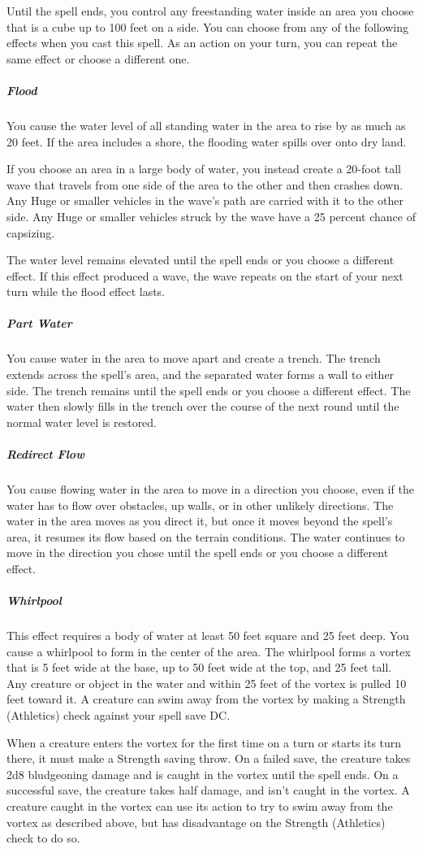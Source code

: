 Until the spell ends, you control any freestanding water inside an area you choose that is a cube up to 100 feet on a side. You can choose from any of the following effects when you cast this spell. As an action on your turn, you can repeat the same effect or choose a different one.

\subparagraph*{Flood} You cause the water level of all standing water in the area to rise by as much as 20 feet. If the area includes a shore, the flooding water spills over onto dry land.

If you choose an area in a large body of water, you instead create a 20-foot tall wave that travels from one side of the area to the other and then crashes down. Any Huge or smaller vehicles in the wave's path are carried with it to the other side. Any Huge or smaller vehicles struck by the wave have a 25 percent chance of capsizing.

The water level remains elevated until the spell ends or you choose a different effect. If this effect produced a wave, the wave repeats on the start of your next turn while the flood effect lasts.

\subparagraph*{Part Water} You cause water in the area to move apart and create a trench. The trench extends across the spell's area, and the separated water forms a wall to either side. The trench remains until the spell ends or you choose a different effect. The water then slowly fills in the trench over the course of the next round until the normal water level is restored.

\subparagraph*{Redirect Flow} You cause flowing water in the area to move in a direction you choose, even if the water has to flow over obstacles, up walls, or in other unlikely directions. The water in the area moves as you direct it, but once it moves beyond the spell's area, it resumes its flow based on the terrain conditions. The water continues to move in the direction you chose until the spell ends or you choose a different effect.

\subparagraph*{Whirlpool} This effect requires a body of water at least 50 feet square and 25 feet deep. You cause a whirlpool to form in the center of the area. The whirlpool forms a vortex that is 5 feet wide at the base, up to 50 feet wide at the top, and 25 feet tall. Any creature or object in the water and within 25 feet of the vortex is pulled 10 feet toward it. A creature can swim away from the vortex by making a Strength (Athletics) check against your spell save DC.

When a creature enters the vortex for the first time on a turn or starts its turn there, it must make a Strength saving throw. On a failed save, the creature takes 2d8 bludgeoning damage and is caught in the vortex until the spell ends. On a successful save, the creature takes half damage, and isn't caught in the vortex. A creature caught in the vortex can use its action to try to swim away from the vortex as described above, but has disadvantage on the Strength (Athletics) check to do so.

